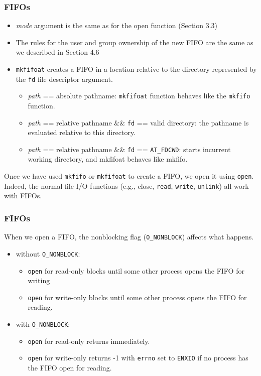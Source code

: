 \documentclass[newPxFont,sthlmFooter,nooffset]{beamer}
\begin{document}
\begin{frame}[t]
  \frametitle{FIFOs}
\begin{itemize}
\item \textit{mode} argument is the same as for the open function (Section 3.3)
\item The rules for the user and group ownership of the new FIFO are the same as we described in Section 4.6
\item \texttt{mkfifoat} creates a FIFO in a location relative to the directory represented by the \texttt{fd} file descriptor argument.
{\footnotesize
  \begin{itemize}
  \item \textit{path} == absolute pathname: \texttt{mkfifoat} function behaves like the \texttt{mkfifo} function.
  \item \textit{path} == relative pathname $\&\&$ \texttt{fd} == valid directory: the pathname is evaluated relative to this directory.
  \item \textit{path} == relative pathname $\&\&$ \texttt{fd} == \texttt{AT\_FDCWD}: starts incurrent working directory, and mkfifoat behaves like mkfifo.
  \end{itemize}
}
\end{itemize}

Once we have used \texttt{mkfifo} or \texttt{mkfifoat} to create a FIFO, we open it using \texttt{open}. Indeed, the normal file I/O functions (e.g., close, \texttt{read}, \texttt{write}, \texttt{unlink}) all work with FIFOs.
\end{frame}


\begin{frame}[t]
  \frametitle{FIFOs}
When we open a FIFO, the nonblocking flag (\texttt{O\_NONBLOCK}) affects what happens.
\begin{itemize}
\item without \texttt{O\_NONBLOCK}:
  \begin{itemize}
  \item \texttt{open} for read-only blocks until some other process
    opens the FIFO for writing
  \item \texttt{open} for write-only blocks until some other process opens the FIFO for reading.
  \end{itemize}
\item with \texttt{O\_NONBLOCK}:
  \begin{itemize}
  \item  \texttt{open} for read-only returns immediately.
  \item \texttt{open} for write-only returns -1 with \texttt{errno} set to \texttt{ENXIO} if no process has the FIFO open for reading.
  \end{itemize}
\end{itemize}
\end{frame}
\end{document}
